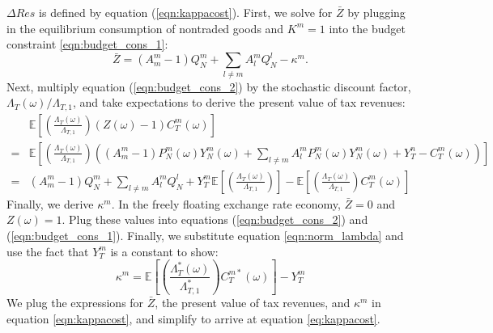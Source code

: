 $\Delta Res$ is defined by equation (\ref{eqn:kappacost}). First, we
solve for $\bar{Z}$ by plugging in the equilibrium consumption of
nontraded goods and $K^m = 1$ into the budget constraint
\eqref{eqn:budget_cons_1}:
\begin{equation*}
  \bar{Z}
  = \left( A^m_m - 1 \right) Q^m_N + \sum_{l \neq m} A^m_l Q^l_N 
  - \kappa^m.
\end{equation*}
Next, multiply equation (\ref{eqn:budget_cons_2}) by the stochastic
discount factor, $\Lambda_T(\omega) / \Lambda_{T, 1}$, and take
expectations to derive the present value of tax revenues:
\begin{align*}
  &  \mathbb{E}\left[ 
    \left( \frac{\Lambda_T(\omega)}{\Lambda_{T, 1}} \right) 
    \left(Z(\omega) - 1\right) C^m_T(\omega) \right] \\
  = & \mathbb{E}\left[ 
      \left( \frac{\Lambda_T(\omega)}{\Lambda_{T, 1}} \right) 
      \left( \left( A^m_m - 1 \right) P^m_N(\omega) Y^m_N(\omega) +
      \sum_{l \neq m} A^m_l P^m_N(\omega) Y^m_N(\omega) + Y^n_T -
      C^m_T(\omega) \right) \right] \\
  = & \left( A^m_m - 1 \right) Q^m_N + \sum_{l \neq m} A^m_l Q^l_N + 
      Y^m_T \mathbb{E} \left[ \left( 
      \frac{\Lambda_T(\omega)}{\Lambda_{T, 1}} \right) \right] - 
      \mathbb{E}\left[ 
      \left( \frac{\Lambda_T(\omega)}{\Lambda_{T, 1}} \right) 
      C^m_T(\omega) \right] 
\end{align*}
Finally, we derive $\kappa^m$. In the freely floating exchange rate
economy, $\bar{Z} = 0$ and $Z(\omega) = 1$. Plug these values into
equations (\ref{eqn:budget_cons_2}) and (\ref{eqn:budget_cons_1}).
Finally, we substitute equation \eqref{eqn:norm_lambda} and use the
fact that $Y^m_T$ is a constant to show:
\begin{equation}
  \kappa^m = \mathbb{E}\left[ 
    \left( \frac{\Lambda^{\ast}_T(\omega)}{\Lambda^{\ast}_{T, 1}} \right) 
    C_T^{m \ast}(\omega) \right]  - Y^m_T 
  \label{eqn:defn_kappa}
\end{equation}
We plug the expressions for $\bar{Z}$, the present value of tax
revenues, and $\kappa^m$ in equation \eqref{eqn:kappacost}, and
simplify to arrive at equation \eqref{eq:kappacost}.


